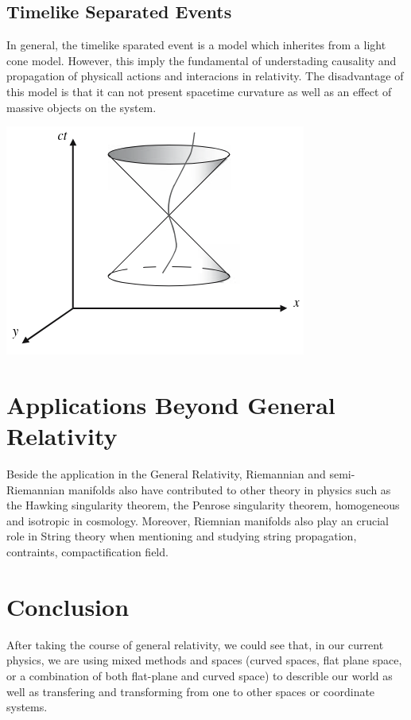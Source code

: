 \documentclass[11pt,a4paper]{article}
\begin{document}
	\subsection{Timelike Separated Events} 
	In general, the timelike sparated event is a model which inherites  from a light cone model. However, this imply the fundamental of understading causality and propagation of physicall actions and interacions in relativity. The disadvantage of this model is that it can not present spacetime curvature as well as an effect of massive objects on the system.
	\begin{center}
		\includegraphics[scale=0.5]{./lih_cone_time.png}
	\end{center}
	\section{Applications Beyond General Relativity}
	Beside the application in the General Relativity, Riemannian and semi-Riemannian manifolds also have contributed to other theory in physics such as the Hawking singularity theorem, the Penrose singularity theorem, homogeneous and isotropic in cosmology. Moreover, Riemnian manifolds also play an crucial role in String theory when mentioning and studying  string propagation,  contraints, compactification field.
	\section{Conclusion}
	After taking the course of general relativity, we could see that, in our current physics, we are using mixed methods and spaces (curved spaces, flat plane space, or a combination of both flat-plane and curved space) to describle our world as well as transfering and transforming from one to other spaces or coordinate systems.
\end{document}
